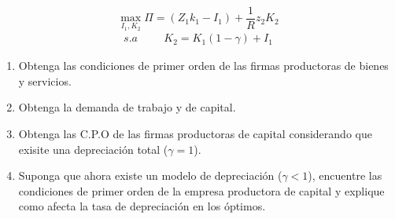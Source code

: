 \documentclass[a4paper,12pt]{article}
\begin{document}
\begin{equation*}
\max_{I_1, K_2}\Pi =(Z_1k_1-I_1)+\frac{1}{R}z_2K_2
\end{equation*}
\begin{align*}
    s.a \hspace{1cm} K_2=K_1(1-\gamma)+I_1
\end{align*}

\begin{enumerate}[label=\alph*)]
\item Obtenga las condiciones de primer orden de las firmas productoras de bienes y servicios.
\item Obtenga la demanda de trabajo y de capital.
\item Obtenga las C.P.O de las firmas productoras de capital considerando que exisite una depreciación total ($\gamma =1$).
\item Suponga que ahora existe un modelo de depreciación ($\gamma<1$), encuentre las condiciones de primer orden de la empresa productora de capital y explique como afecta la tasa de depreciación en los óptimos.
\end{enumerate}
\end{document}

